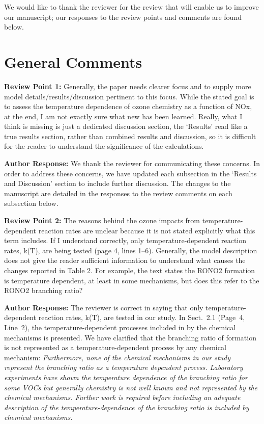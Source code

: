 \documentclass{article}
\begin{document}
We would like to thank the reviewer for the review that will enable us to improve our manuscript; our responses to the review points and comments are found below.

\section*{General Comments}

\textbf{Review Point 1:}  Generally, the paper needs clearer focus and to supply more model details/results/discussion pertinent to this focus. While the stated goal is to assess the temperature dependence of ozone chemistry as a function of NOx, at the end, I am not exactly sure what new has been learned. Really, what I think is missing is just a dedicated discussion section, the `Results' read like a true results section, rather than combined results and discussion, so it is difficult for the reader to understand the significance of the calculations.

\textbf{Author Response:} We thank the reviewer for communicating these concerns. In order to address these concerns, we have updated each subsection in the `Results and Discussion' section to include further discussion. The changes to the manuscript are detailed in the responses to the review comments on each subsection below.

\textbf{Review Point 2:} The reasons behind the ozone impacts from temperature-dependent reaction rates are unclear because it is not stated explicitly what this term includes. If I understand correctly, only temperature-dependent reaction rates, k(T), are being tested (page 4, lines 1–6). Generally, the model description does not give the reader sufficient information to understand what causes the changes reported in Table 2. For example, the text states the RONO2 formation is temperature dependent, at least in some mechanisms, but does this refer to the RONO2 branching ratio?

\textbf{Author Response:} The reviewer is correct in saying that only temperature-dependent reaction rates, k(T), are tested in our study. In Sect.~2.1 (Page~4, Line~2), the temperature-dependent processes included in by the chemical mechanisms is presented. We have clarified that the branching ratio of  formation is not represented as a temperature-dependent process by any chemical mechanism:
\textit{Furthermore, none of the chemical mechanisms in our study represent the  branching ratio as a temperature dependent process. 
Laboratory experiments have shown the temperature dependence of the  branching ratio for some VOCs \citep{Atkinson:1987} but generally  chemistry is not well known \citep{Pusede:2015} and not represented by the chemical mechanisms.
Further work is required before including an adequate description of the temperature-dependence of the  branching ratio is included by chemical mechanisms.
}
\end{document}
